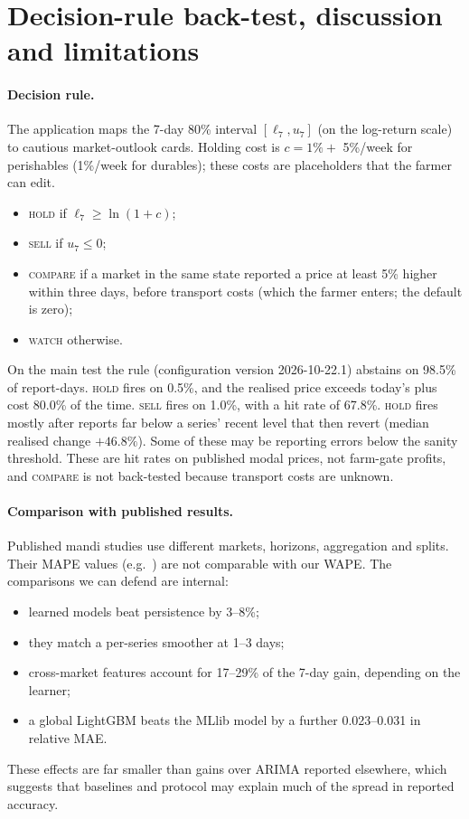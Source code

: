 \section{Decision-rule back-test, discussion and limitations}\label{sec:discussion}

\paragraph{Decision rule.}
The application maps the 7-day 80\% interval $[\ell_7,u_7]$ (on the log-return scale) to cautious market-outlook cards. Holding cost is $c=1\%+$ 5\%/week for perishables (1\%/week for durables); these costs are placeholders that the farmer can edit.
\begin{itemize}
  \item \textsc{hold} if $\ell_7\ge\ln(1+c)$;
  \item \textsc{sell} if $u_7\le0$;
  \item \textsc{compare} if a market in the same state reported a price at least 5\% higher within three days, before transport costs (which the farmer enters; the default is zero);
  \item \textsc{watch} otherwise.
\end{itemize}
On the main test the rule (configuration version 2026-10-22.1) abstains on 98.5\% of report-days.
\textsc{hold} fires on 0.5\%, and the realised price exceeds today's plus cost 80.0\% of the time. \textsc{sell} fires on 1.0\%, with a hit rate of 67.8\%.
\textsc{hold} fires mostly after reports far below a series' recent level that then revert (median realised change $+46.8\%$). Some of these may be reporting errors below the sanity threshold.
These are hit rates on published modal prices, not farm-gate profits, and \textsc{compare} is not back-tested because transport costs are unknown.

\paragraph{Comparison with published results.}
Published mandi studies use different markets, horizons, aggregation and splits. Their MAPE values (e.g.\ \cite{manogna2025deep}) are not comparable with our WAPE.
The comparisons we can defend are internal:
\begin{itemize}
  \item learned models beat persistence by 3--8\%;
  \item they match a per-series smoother at 1--3 days;
  \item cross-market features account for 17--29\% of the 7-day gain, depending on the learner;
  \item a global LightGBM beats the MLlib model by a further 0.023--0.031 in relative MAE.
\end{itemize}
These effects are far smaller than gains over ARIMA reported elsewhere, which suggests that baselines and protocol may explain much of the spread in reported accuracy.

